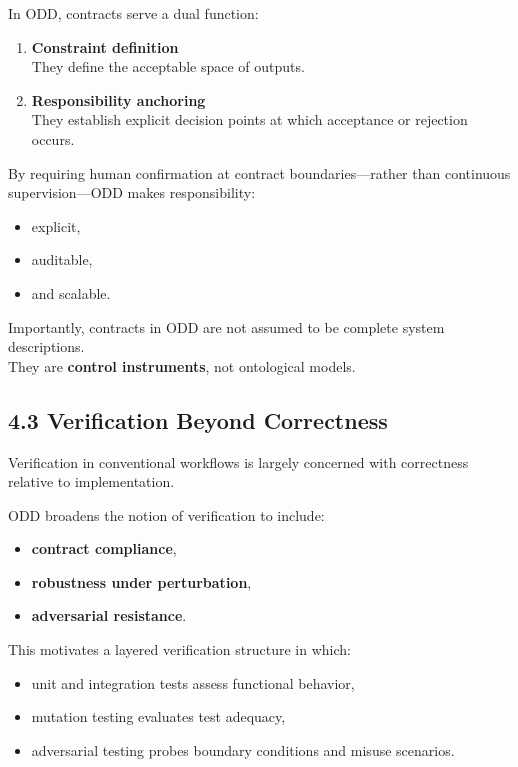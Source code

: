 \documentclass[
]{article}
\begin{document}
In ODD, contracts serve a dual function:

\begin{enumerate}
\def\labelenumi{\arabic{enumi}.}
\item
  \textbf{Constraint definition}\\
  They define the acceptable space of outputs.
\item
  \textbf{Responsibility anchoring}\\
  They establish explicit decision points at which acceptance or
  rejection occurs.
\end{enumerate}

By requiring human confirmation at contract boundaries---rather than
continuous supervision---ODD makes responsibility:

\begin{itemize}
\item
  explicit,
\item
  auditable,
\item
  and scalable.
\end{itemize}

Importantly, contracts in ODD are not assumed to be complete system
descriptions.\\
They are \textbf{control instruments}, not ontological models.

\hypertarget{43-verification-beyond-correctness}{%
\subsection{4.3 Verification Beyond
Correctness}\label{43-verification-beyond-correctness}}

Verification in conventional workflows is largely concerned with
correctness relative to implementation.

ODD broadens the notion of verification to include:

\begin{itemize}
\item
  \textbf{contract compliance},
\item
  \textbf{robustness under perturbation},
\item
  \textbf{adversarial resistance}.
\end{itemize}

This motivates a layered verification structure in which:

\begin{itemize}
\item
  unit and integration tests assess functional behavior,
\item
  mutation testing evaluates test adequacy,
\item
  adversarial testing probes boundary conditions and misuse scenarios.
\end{itemize}
\end{document}
